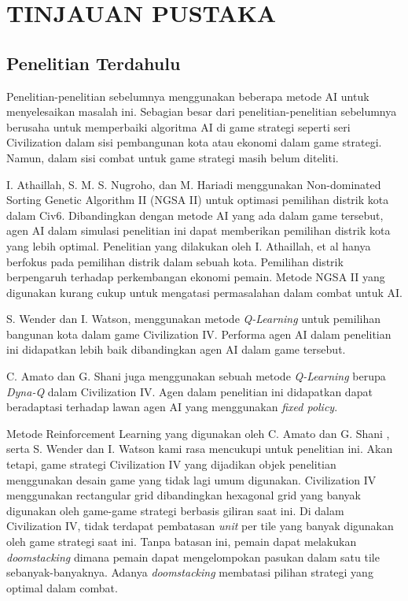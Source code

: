 \chapter{TINJAUAN PUSTAKA}
\label{chap:tinjauanpustaka}


\section{Penelitian Terdahulu}
\label{sec:penelitianterdahulu}

Penelitian-penelitian sebelumnya menggunakan beberapa metode AI untuk menyelesaikan masalah ini. 
Sebagian besar dari penelitian-penelitian sebelumnya berusaha untuk memperbaiki algoritma AI di game strategi seperti seri Civilization dalam sisi pembangunan kota atau ekonomi dalam game strategi. 
Namun, dalam sisi combat untuk game strategi masih belum diteliti.

I. Athaillah, S. M. S. Nugroho, dan M. Hariadi menggunakan Non-dominated Sorting Genetic Algorithm II (NGSA II) untuk optimasi pemilihan distrik kota dalam Civ6. Dibandingkan dengan metode AI yang ada dalam game tersebut, agen AI dalam simulasi penelitian ini dapat memberikan pemilihan distrik kota yang lebih optimal. Penelitian yang dilakukan oleh I. Athaillah, et al hanya berfokus pada pemilihan distrik dalam sebuah kota. Pemilihan distrik berpengaruh terhadap perkembangan ekonomi pemain. 
Metode NGSA II yang digunakan kurang cukup untuk mengatasi permasalahan dalam combat untuk AI. 

S. Wender dan I. Watson, menggunakan metode \emph{Q-Learning} untuk pemilihan bangunan kota dalam game Civilization IV. 
Performa agen AI dalam penelitian ini didapatkan lebih baik dibandingkan agen AI dalam game tersebut.

C. Amato dan G. Shani juga menggunakan sebuah metode \emph{Q-Learning} berupa \emph{Dyna-Q} dalam Civilization IV. 
Agen dalam penelitian ini didapatkan dapat beradaptasi terhadap lawan agen AI yang menggunakan \emph{fixed policy}.

Metode Reinforcement Learning yang digunakan oleh C. Amato dan G. Shani \citep{civ4RL}, serta S. Wender dan I. Watson kami rasa mencukupi untuk penelitian ini. Akan tetapi, game strategi Civilization IV yang dijadikan objek penelitian menggunakan desain game yang tidak lagi umum digunakan. Civilization IV menggunakan rectangular grid dibandingkan hexagonal grid yang banyak digunakan oleh game-game strategi berbasis giliran saat ini. Di dalam Civilization IV, tidak terdapat pembatasan \emph{unit} per tile yang banyak digunakan oleh game strategi saat ini. Tanpa batasan ini, pemain dapat melakukan \emph{doomstacking} dimana pemain dapat mengelompokan pasukan dalam satu tile sebanyak-banyaknya. 
Adanya \emph{doomstacking} membatasi pilihan strategi yang optimal dalam combat.

